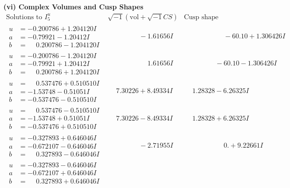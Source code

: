 \documentclass[1p]{elsarticle_modified}
\theoremstyle{definition}
\newcommand{\I}{\sqrt{-1}}
\begin{document}
\newpage\flushleft \textbf{(vi) Complex Volumes and Cusp Shapes}
$$\begin{array}{c|c|c}  
\text{Solutions to }I^u_{5}& \I (\text{vol} + \sqrt{-1}CS) & \text{Cusp shape}\\
 \hline 
\begin{aligned}
u &= -0.200786 + 1.204120 I \\
a &= -0.79921 - 1.20412 I \\
b &= \phantom{-}0.200786 - 1.204120 I\end{aligned}
 & \phantom{-0.000000 } -1.61656 I & \phantom{-0.000000 -}     -6
0. 10   + 1.306426 I \\ \hline\begin{aligned}
u &= -0.200786 - 1.204120 I \\
a &= -0.79921 + 1.20412 I \\
b &= \phantom{-}0.200786 + 1.204120 I\end{aligned}
 & \phantom{-0.000000 -}1.61656 I & \phantom{-0.000000 }      -6
0. 10   - 1.306426 I \\ \hline\begin{aligned}
u &= \phantom{-}0.537476 + 0.510510 I \\
a &= -1.53748 - 0.51051 I \\
b &= -0.537476 - 0.510510 I\end{aligned}
 & \phantom{-}7.30226 + 8.49334 I & \phantom{-}1.28328 - 6.26325 I \\ \hline\begin{aligned}
u &= \phantom{-}0.537476 - 0.510510 I \\
a &= -1.53748 + 0.51051 I \\
b &= -0.537476 + 0.510510 I\end{aligned}
 & \phantom{-}7.30226 - 8.49334 I & \phantom{-}1.28328 + 6.26325 I \\ \hline\begin{aligned}
u &= -0.327893 + 0.646046 I \\
a &= -0.672107 - 0.646046 I \\
b &= \phantom{-}0.327893 - 0.646046 I\end{aligned}
 & \phantom{-0.000000 } -2.71955 I & \phantom{-0.000000 -}0. + 9.22661 I \\ \hline\begin{aligned}
u &= -0.327893 - 0.646046 I \\
a &= -0.672107 + 0.646046 I \\
b &= \phantom{-}0.327893 + 0.646046 I\end{aligned}

\end{array}$$
\end{document}
